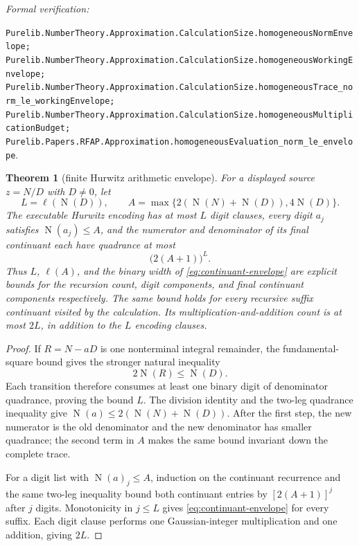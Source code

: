 \documentclass[11pt]{article}
\newtheorem{theorem}{Theorem}[section]
\newcommand{\Norm}[1]{\operatorname{N}\!\left(#1\right)}
\newcommand{\leanref}[1]{\par\smallskip\noindent
  \emph{Formal verification:}\par\nobreak
  {\raggedright\nolinkurl{#1}.\par}}
\begin{document}
\leanref{Purelib.NumberTheory.Approximation.CalculationSize.homogeneousNormEnvelope;
Purelib.NumberTheory.Approximation.CalculationSize.homogeneousWorkingEnvelope;
Purelib.NumberTheory.Approximation.CalculationSize.homogeneousTrace_norm_le_workingEnvelope;
Purelib.NumberTheory.Approximation.CalculationSize.homogeneousMultiplicationBudget;
Purelib.Papers.RFAP.Approximation.homogeneousEvaluation_norm_le_envelope}

\begin{theorem}[finite Hurwitz arithmetic envelope]
\label{thm:hurwitz-arithmetic-envelope}
For a displayed source $z=N/D$ with $D\ne0$, let
\[
 L=\ell(\Norm D),\qquad
 A=\max\{2(\Norm N+\Norm D),4\Norm D\}.
\]
The executable Hurwitz encoding has at most $L$ digit clauses, every digit
$a_j$ satisfies $\Norm{a_j}\le A$, and the numerator and denominator of its
final continuant each have quadrance at most
\begin{equation}
\label{eq:continuant-envelope}
                         \bigl(2(A+1)\bigr)^L.
\end{equation}
Thus $L$, $\ell(A)$, and the binary width of
\eqref{eq:continuant-envelope} are explicit bounds for the recursion count,
digit components, and final continuant components respectively.
The same bound holds for every recursive suffix continuant visited by the
calculation.  Its multiplication-and-addition count is at most $2L$, in
addition to the $L$ encoding clauses.
\end{theorem}

\begin{proof}
If $R=N-aD$ is one nonterminal integral remainder, the fundamental-square
bound gives the stronger natural inequality
\[
                         2\Norm R\le\Norm D.
\]
Each transition therefore consumes at least one binary digit of denominator
quadrance, proving the bound $L$.  The division identity and the two-leg
quadrance inequality give
$\Norm a\le2(\Norm N+\Norm D)$.  After the first step, the new numerator is
the old denominator and the new denominator has smaller quadrance; the second
term in $A$ makes the same bound invariant down the complete trace.

For a digit list with $\Norm a_j\le A$, induction on the continuant recurrence
and the same two-leg inequality bound both continuant entries by
$[2(A+1)]^j$ after $j$ digits.  Monotonicity in $j\le L$ gives
\eqref{eq:continuant-envelope} for every suffix.  Each digit clause performs
one Gaussian-integer multiplication and one addition, giving $2L$.
\end{proof}
\end{document}
